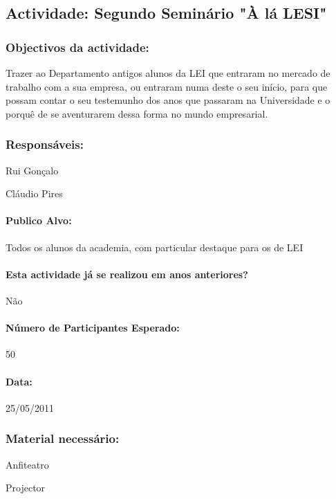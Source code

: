 \subsection{Actividade: Segundo Seminário "À lá LESI"} %

\subsubsection*{Objectivos da actividade:}
Trazer ao Departamento antigos alunos da LEI que entraram no mercado de trabalho com a sua empresa, ou entraram numa deste o seu início, para que possam contar o seu testemunho dos anos que passaram na Universidade e o porquê de se aventurarem dessa forma no mundo empresarial.

\subsubsection*{Responsáveis:}
\begin{itemizedash}
	\item{Rui Gonçalo}
	\item{Cláudio Pires}
\end{itemizedash}

\paragraph{Publico Alvo: }
Todos os alunos da academia, com particular destaque para os de LEI

\paragraph{Esta actividade já se realizou em anos anteriores?}
Não

\paragraph{Número de Participantes Esperado:}
50

\paragraph{Data:} 25/05/2011

\subsubsection*{Material necessário:}
\begin{itemizedash}
	\item{Anfiteatro}
	\item{Projector}
\end{itemizedash}

